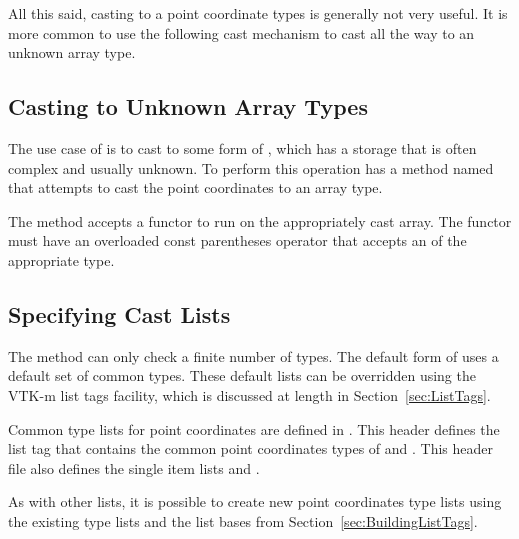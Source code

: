 All this said, casting to a point coordinate types is generally not very
useful. It is more common to use the following cast mechanism to cast all
the way to an unknown array type.

\subsection{Casting to Unknown Array Types}


The use case of  is to cast to some
form of , which has a storage that is often
complex and usually unknown. To perform this operation
 has a method named
 that attempts to cast the point coordinates to an
array type.

The  method accepts a functor to run on the
appropriately cast array. The functor must have an overloaded const
parentheses operator that accepts an  of the
appropriate type.


\subsection{Specifying Cast Lists}

The  method can only check a finite number of types.
The default form of  uses a default set of common
types. These default lists can be overridden using the VTK-m list tags
facility, which is discussed at length in Section~\ref{sec:ListTags}.


Common type lists for point coordinates are defined in
. This header defines the
list tag  that contains the common
point coordinates types of  and
. This header file also defines the
single item lists  and
.

As with other lists, it is possible to create new point coordinates type
lists using the existing type lists and the list bases from
Section~\ref{sec:BuildingListTags}.

